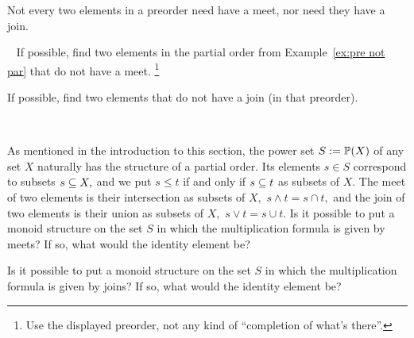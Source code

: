 \documentclass[CT4S-EN-RU]{subfiles}
\begin{document}
\begin{exerciseRUS}
\end{exerciseRUS}

\begin{blockENG}
Not every two elements in a preorder need have a meet, nor need they have a join. 
\end{blockENG}

\begin{blockRUS}
\end{blockRUS}

\begin{exerciseENG}\label{exc:not all meets and joins}~
\sexc If possible, find two elements in the partial order from Example~\ref{ex:pre not par} that do not have a meet.
\footnote{Use the displayed preorder, not any kind of “completion of what's there”.} 
\item If possible, find two elements that do not have a join (in that preorder).
\endsexc
\end{exerciseENG}

\begin{exerciseRUS}\label{exc:not all meets and joins}~
\end{exerciseRUS}

\begin{exerciseENG}
As mentioned in the introduction to this section, the power set $S:=\PP(X)$ of any set $X$ naturally has the structure of a partial order. Its elements $s\in S$ correspond to subsets $s\ss X,$ and we put $s\leq t$ if and only if $s\ss t$ as subsets of $X.$ The meet of two elements is their intersection as subsets of $X,$ $s\wedge t= s\cap t,$ and the join of two elements is their union as subsets of $X,$ $s\vee t=s\cup t.$
\sexc Is it possible to put a monoid structure on the set $S$ in which the multiplication formula is given by meets? If so, what would the identity element be?
\item Is it possible to put a monoid structure on the set $S$ in which the multiplication formula is given by joins? If so, what would the identity element be?
\endsexc
\end{exerciseENG}

\begin{exerciseRUS}
\end{exerciseRUS}
\end{document}

